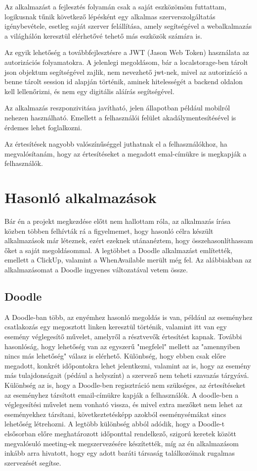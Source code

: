 \documentclass[a4paper,12pt]{report}
\theoremstyle{definition}
\theoremstyle{remark}
\begin{document}
Az alkalmazást a fejlesztés folyamán csak a saját eszközömöm futtattam, logikusnak tűnik következő lépésként egy alkalmas szerverszolgáltatás igénybevétele, esetleg saját szerver felállítása, amely segítségével a webalkalmazás a világhálón keresztül elérhetővé tehető más eszközök számára is.

Az egyik lehetőség a továbbfejlesztésre a JWT\cite{JWTwebsite} (Jason Web Token) használata az autorizációs folyamatokra. A jelenlegi megoldásom, bár a localstorage-ben tárolt json objektum segítségével zajlik, nem nevezhető jwt-nek, mivel az autorizáció a benne tárolt session id alapján történik, aminek hitelességét a backend oldalon kell lellenőrizni, és nem egy digitális aláírás segítségével.

Az alkalmazás reszponzivitása javítható, jelen állapotban például mobilról nehezen használható. Emellett a felhasználói felület akadálymentesítésével is érdemes lehet foglalkozni.

Az értesítések nagyobb valószínűséggel juthatnak el a felhasználókhoz, ha megvalósítanám, hogy az értesítéseket a megadott emal-címükre is megkapják a felhasználók.

\chapter{Hasonló alkalmazások}

Bár én a projekt megkezdése előtt nem hallottam róla, az alkalmazás írása közben többen felhívták rá a figyelmemet, hogy hasonló célra készült alkalmazások már léteznek, ezért ezeknek utánanéztem, hogy összehasonlíthassam őket a saját megoldásommal. A legtöbbet a Doodle alkalmazást említették, emellett a ClickUp, valamint a WhenAvailable merült még fel. Az alábbiakban az alkalmazásomat a Doodle\cite{DoodleWebsite} ingyenes változatával vetem össze.

\section{Doodle}

A Doodle-ban több, az enyémhez hasonló megoldás is van, például az eseményhez csatlakozás egy megosztott linken keresztül történik, valamint itt van egy esemény véglegesítő művelet, amelyről a résztvevők értesítést kapnak.  További hasonlóság, hogy lehetőség van az egyszerű "megfelel" mellett az "amennyiben nincs más lehetőség" válasz is elérhető. Különbség, hogy ebben csak előre megadott, konkrét időpontokra lehet jelentkezni, valamint az is, hogy az esemény más tulajdonságait (pédául a helyszínt) a szervező nem teheti szavazás tárgyává. Különbség az is, hogy a Doodle-ben regisztráció nem szükséges, az értesítéseket az eseményhez társított email-címükre kapják a felhasználók. A doodle-ben a véglegesítési művelet nem vonható vissza, és mivel extra mezőket nem lehet az eseményekhez társítani, következtetésképp azokból eseménysémákat sincs lehetőség létrehozni. A legtöbb különbség abból adódik, hogy a Doodle-t elsősorban előre meghatározott időponttal rendelkező, szigorú keretek között megvalósuló meeting-ek megszervezésére készítették, míg az én alkalmazásom inkább arra hivatott, hogy egy adott baráti társaság találkozóinak rugalmas szervezését segítse.
\end{document}
